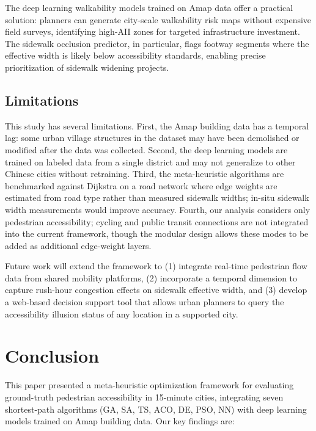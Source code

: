 \documentclass[journal]{IEEEtran}
\begin{document}
The deep learning walkability models trained on Amap data offer a practical solution: planners can generate city-scale walkability risk maps without expensive field surveys, identifying high-AII zones for targeted infrastructure investment. The sidewalk occlusion predictor, in particular, flags footway segments where the effective width is likely below accessibility standards, enabling precise prioritization of sidewalk widening projects.

\subsection{Limitations}

This study has several limitations. First, the Amap building data has a temporal lag: some urban village structures in the dataset may have been demolished or modified after the data was collected. Second, the deep learning models are trained on labeled data from a single district and may not generalize to other Chinese cities without retraining. Third, the meta-heuristic algorithms are benchmarked against Dijkstra on a road network where edge weights are estimated from road type rather than measured sidewalk widths; in-situ sidewalk width measurements would improve accuracy. Fourth, our analysis considers only pedestrian accessibility; cycling and public transit connections are not integrated into the current framework, though the modular design allows these modes to be added as additional edge-weight layers.

Future work will extend the framework to (1) integrate real-time pedestrian flow data from shared mobility platforms, (2) incorporate a temporal dimension to capture rush-hour congestion effects on sidewalk effective width, and (3) develop a web-based decision support tool that allows urban planners to query the accessibility illusion status of any location in a supported city.

\section{Conclusion}

This paper presented a meta-heuristic optimization framework for evaluating ground-truth pedestrian accessibility in 15-minute cities, integrating seven shortest-path algorithms (GA, SA, TS, ACO, DE, PSO, NN) with deep learning models trained on Amap building data. Our key findings are:
\end{document}
